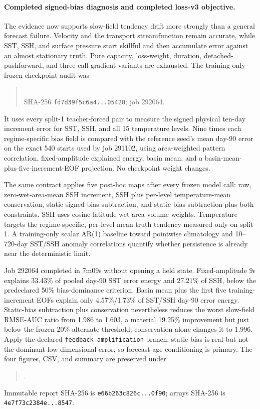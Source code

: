 \documentclass[11pt]{article}
\begin{document}
\paragraph{Completed signed-bias diagnosis and completed loss-v3 objective.}
The evidence now supports slow-field tendency drift more strongly than a general
forecast failure.  Velocity and the transport streamfunction remain accurate, while
SST, SSH, and surface pressure start skillful and then accumulate error against an
almost stationary truth.  Pure capacity, loss-weight, duration, detached-pushforward,
and three-call-gradient variants are exhausted.  The training-only frozen-checkpoint
audit was
\begin{quote}
\\
SHA-256 \texttt{fd7d39f5c6a4...05428}; job 292064.
\end{quote}
It uses every split-1 teacher-forced pair to measure the signed physical ten-day
increment error for SST, SSH, and all 15 temperature levels.  Nine times each
regime-specific bias field is compared with the reference seed's mean day-90 error on
the exact 540 starts used by job 291102, using area-weighted pattern correlation,
fixed-amplitude explained energy, basin mean, and a basin-mean-plus-five-increment-EOF
projection.  No checkpoint weight changes.

The same contract applies five post-hoc maps after every frozen model call: raw,
zero-wet-area-mean SSH increment, SSH plus per-level temperature-mean conservation,
static signed-bias subtraction, and static-bias subtraction plus both constraints.
SSH uses cosine-latitude wet-area volume weights.  Temperature targets the
regime-specific, per-level mean truth tendency measured only on split 1.  A
training-only scalar AR(1) baseline toward pointwise climatology and 10--720-day
SST/SSH anomaly correlations quantify whether persistence is already near the
deterministic limit.

Job 292064 completed in 7m09s without opening a held state.  Fixed-amplitude
\(9\epsilon\) explains 33.43\% of pooled day-90 SST error energy and 27.21\% of SSH,
below the predeclared 50\% bias-dominance criterion.  Basin mean plus the first five
training-increment EOFs explain only 4.57\%/1.73\% of SST/SSH day-90 error energy.
Static-bias subtraction plus conservation nevertheless reduces the worst slow-field
RMSE-AUC ratio from 1.986 to 1.603, a material 19.25\% improvement but just below the
frozen 20\% alternate threshold; conservation alone changes it to 1.996.  Apply the
declared \texttt{feedback\_amplification} branch:
static bias is real but not the dominant low-dimensional error, so forecast-age
conditioning is primary.  The four figures, CSV, and summary are preserved under
\begin{quote}
.
\end{quote}
Immutable report SHA-256 is \texttt{e66b263c826c...0f90}; arrays SHA-256 is
\texttt{4e7f73c2384e...8547}.
\end{document}
